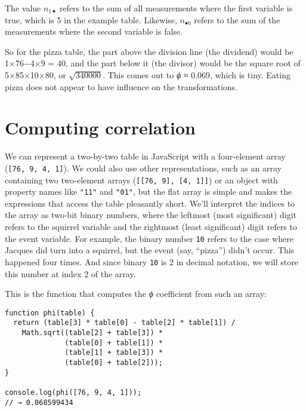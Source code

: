 The value $n_{1\bullet}$ refers to the sum of all measurements where the first variable is true, which is 5 in the example table. Likewise, $n_{\bullet0}$ refers to the sum of the measurements where the second variable is false.

So for the pizza table, the part above the division line (the dividend) would be 1×76−4×9 = 40, and the part below it (the divisor) would be the square root of 5×85×10×80, or $\sqrt{340000}$. This comes out to \emph{ϕ} ≈ 0.069, which is tiny. Eating pizza does not appear to have influence on the transformations.

\section{Computing correlation}

We can represent a two-by-two table in JavaScript with a four-element array (\lstinline`[76, 9, 4, 1]`). We could also use other representations, such as an array containing two two-element arrays (\lstinline`[[76, 9], [4, 1]]`) or an object with property names like \lstinline`"11"` and \lstinline`"01"`, but the flat array is simple and makes the expressions that access the table pleasantly short. We'll interpret the indices to the array as two-bit binary numbers, where the leftmost (most significant) digit refers to the squirrel variable and the rightmost (least significant) digit refers to the event variable. For example, the binary number \lstinline`10` refers to the case where Jacques did turn into a squirrel, but the event (say, ``pizza'') didn't occur. This happened four times. And since binary \lstinline`10` is 2 in decimal notation, we will store this number at index 2 of the array.

\label{data.phi_function}This is the function that computes the \emph{ϕ} coefficient from such an array:

\begin{lstlisting}
function phi(table) {
  return (table[3] * table[0] - table[2] * table[1]) /
    Math.sqrt((table[2] + table[3]) *
              (table[0] + table[1]) *
              (table[1] + table[3]) *
              (table[0] + table[2]));
}

console.log(phi([76, 9, 4, 1]));
// → 0.068599434
\end{lstlisting}
\noindent{}

